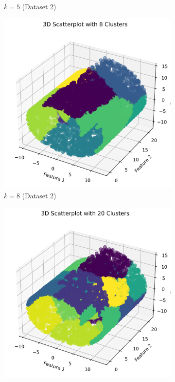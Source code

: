 \documentclass{article}
\begin{document}
\begin{figure}[h]
\begin{subfigure}[b]{0.45\textwidth}
        \caption{$k=5$ (Dataset 2)}
        \label{fig:3d_k5}
    \end{subfigure}
    \begin{subfigure}[b]{0.45\textwidth}
        \includegraphics[width=\textwidth]{figures/random_3d_scatter_k8_d1.png}
        \caption{$k=8$ (Dataset 2)}
        \label{fig:3d_k8}
    \end{subfigure}
    \begin{subfigure}[b]{0.45\textwidth}
        \includegraphics[width=\textwidth]{figures/random_3d_scatter_k20_d1.png}

\end{subfigure}
\end{figure}
\end{document}
